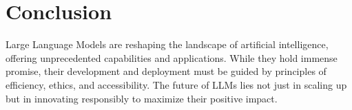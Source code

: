 \section{Conclusion}
Large Language Models are reshaping the landscape of artificial intelligence, offering unprecedented capabilities and applications. While they hold immense promise, their development and deployment must be guided by principles of efficiency, ethics, and accessibility. The future of LLMs lies not just in scaling up but in innovating responsibly to maximize their positive impact.


